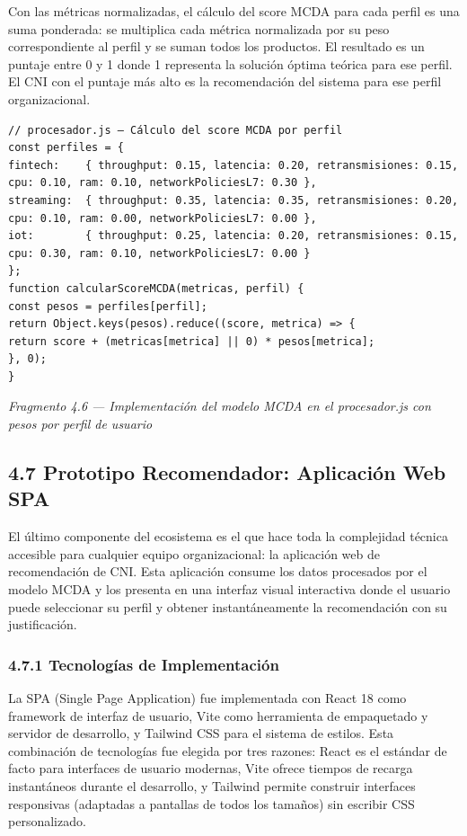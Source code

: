 \documentclass[journal]{IEEEtran}
\begin{document}
Con las métricas normalizadas, el cálculo del score MCDA para cada perfil es una suma ponderada: se multiplica cada métrica normalizada por su peso correspondiente al perfil y se suman todos los productos. El resultado es un puntaje entre 0 y 1 donde 1 representa la solución óptima teórica para ese perfil. El CNI con el puntaje más alto es la recomendación del sistema para ese perfil organizacional.

\begin{lstlisting}[basicstyle=\ttfamily\scriptsize,breaklines=true]
// procesador.js — Cálculo del score MCDA por perfil
const perfiles = {
fintech:    { throughput: 0.15, latencia: 0.20, retransmisiones: 0.15,
cpu: 0.10, ram: 0.10, networkPoliciesL7: 0.30 },
streaming:  { throughput: 0.35, latencia: 0.35, retransmisiones: 0.20,
cpu: 0.10, ram: 0.00, networkPoliciesL7: 0.00 },
iot:        { throughput: 0.25, latencia: 0.20, retransmisiones: 0.15,
cpu: 0.30, ram: 0.10, networkPoliciesL7: 0.00 }
};
function calcularScoreMCDA(metricas, perfil) {
const pesos = perfiles[perfil];
return Object.keys(pesos).reduce((score, metrica) => {
return score + (metricas[metrica] || 0) * pesos[metrica];
}, 0);
}
\end{lstlisting}

\begin{center}\emph{\emph{Fragmento 4.6 --- Implementación del modelo MCDA en el procesador.js con pesos por perfil de usuario}}\end{center}

\subsection{4.7 Prototipo Recomendador: Aplicación Web SPA}

El último componente del ecosistema es el que hace toda la complejidad técnica accesible para cualquier equipo organizacional: la aplicación web de recomendación de CNI. Esta aplicación consume los datos procesados por el modelo MCDA y los presenta en una interfaz visual interactiva donde el usuario puede seleccionar su perfil y obtener instantáneamente la recomendación con su justificación.

\subsubsection{4.7.1 Tecnologías de Implementación}

La SPA (Single Page Application) fue implementada con React 18 como framework de interfaz de usuario, Vite como herramienta de empaquetado y servidor de desarrollo, y Tailwind CSS para el sistema de estilos. Esta combinación de tecnologías fue elegida por tres razones: React es el estándar de facto para interfaces de usuario modernas, Vite ofrece tiempos de recarga instantáneos durante el desarrollo, y Tailwind permite construir interfaces responsivas (adaptadas a pantallas de todos los tamaños) sin escribir CSS personalizado.
\end{document}
